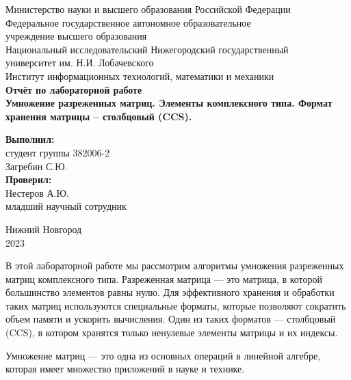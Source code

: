 \documentclass[12pt]{article}
\begin{document}
\begin{center}  %
Министерство науки и высшего образования Российской Федерации\\
\hfill \break
Федеральное государственное автономное образовательное\\
учреждение высшего образования\\
Национальный исследовательский Нижегородский государственный\\
университет им. Н.И. Лобачевского\\
\hfill \break
Институт информационных технологий, математики и механики\\ %
\hfill \break \hfill \break \hfill \break \hfill \break \hfill \break \hfill \break \hfill \break \hfill \break
\large{\textbf{Отчёт по лабораторной работе\\
Умножение разреженных матриц. Элементы комплексного типа. Формат хранения матрицы – столбцовый (CCS).}} \end{center} %
\hfill \break \hfill \break \hfill \break \hfill \break \hfill \break 
\textbf{Выполнил:} \\
студент группы 382006-2\\
Загребин С.Ю.\\
\hfill \break
\textbf{Проверил:} \\
Нестеров А.Ю.\\
младший научный сотрудник\\
\hfill \break \hfill \break \hfill \break \hfill \break \hfill \break \hfill \break 
\begin{center} Нижний Новгород\\ 2023 \end{center}
\thispagestyle{empty} %
\newpage    %

В этой лабораторной работе мы рассмотрим алгоритмы умножения разреженных матриц комплексного типа. Разреженная матрица — это матрица, в которой большинство элементов равны нулю. Для эффективного хранения и обработки таких матриц используются специальные форматы, которые позволяют сократить объем памяти и ускорить вычисления. Один из таких форматов — столбцовый (CCS), в котором хранятся только ненулевые элементы матрицы и их индексы.

Умножение матриц — это одна из основных операций в линейной алгебре, которая имеет множество приложений в науке и технике.
\end{document}
